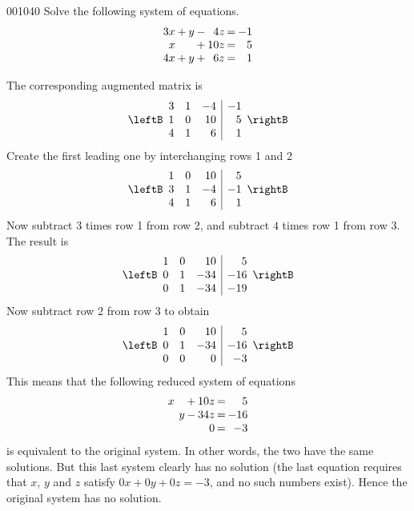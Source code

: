 \begin{example}{}{001040}
Solve the following system of equations.
\begin{equation*}
\arraycolsep=1pt
\begin{array}{rlrlrcr}
	3x & + & y & - & 4z & = & -1 \\
	 x &  &   & + & 10z & = & 5 \\
	4x & + & y & + & 6z & = & 1
\end{array}
\end{equation*}
\begin{solution}
The corresponding augmented matrix is
\begin{equation*}
\leftB \begin{array}{rrr|r}
	3 & 1 & -4 & -1 \\
	1 & 0 & 10 & 5 \\
	4 & 1 &  6  & 1
\end{array} \rightB
\end{equation*}
Create the first leading one by interchanging rows 1 and 2
\begin{equation*}
\leftB \begin{array}{rrr|r}
	1 & 0 & 10 & 5 \\
	3 & 1 & -4 & -1 \\
	4 & 1 & 6 & 1
\end{array} \rightB
\end{equation*}
Now subtract $3$ times row 1 from row 2, and subtract $4$ times row 1 from row 3. The result is
\begin{equation*}
\leftB \begin{array}{rrr|r}
	1 & 0 & 10 & 5 \\
	0 & 1 & -34 & -16 \\
	0 & 1 & -34 & -19
\end{array} \rightB
\end{equation*}
Now subtract row 2 from row 3 to obtain
\begin{equation*}
\leftB \begin{array}{rrr|r}
	1 & 0 & 10 & 5 \\
	0 & 1 & -34 & -16 \\
	0 & 0 & 0 & -3
\end{array} \rightB
\end{equation*}
This means that the following reduced system of equations
\begin{equation*}
\arraycolsep=1pt
\begin{array}{rlrlrcr}
	x &  &   & + & 10z & = & 5 \\
	  &  & y & - & 34z & = &-16 \\
	  &  &   &   &   0 & = & -3
\end{array}
\end{equation*}
is equivalent to the original system. In other words, the two have the same solutions. But this last system clearly has no solution (the last equation requires that $x$, $y$ and $z$ satisfy $0x + 0y + 0z = -3$, and no such numbers exist). Hence the original system has no solution.
\end{solution}
\end{example}

